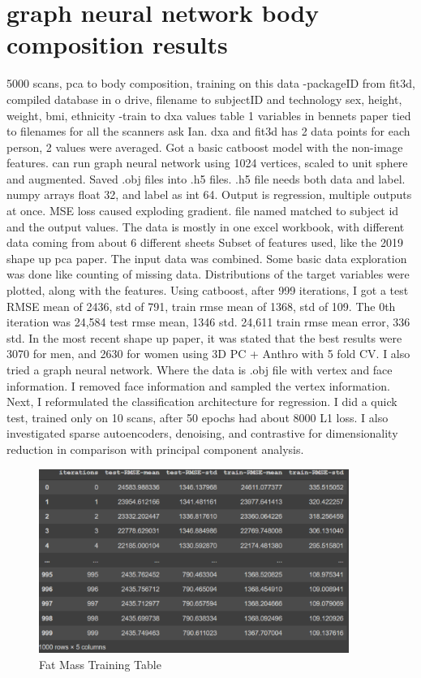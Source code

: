 \section{graph neural network body composition results}

5000 scans, pca to body composition, training on this data
-packageID from fit3d, compiled database in o drive, filename to subjectID and technology sex, height, weight, bmi, ethnicity
-train to dxa values
table 1 variables in bennets paper tied to filenames for all the scanners ask Ian. dxa and fit3d has 2 data points for each person, 2 values were averaged. Got a basic catboost model with the non-image features. can run graph neural network using 1024 vertices, scaled to unit sphere and augmented. Saved .obj files into .h5 files. .h5 file needs both data and label. numpy arrays float 32, and label as int 64. Output is regression, multiple outputs at once. MSE loss caused exploding gradient. file named matched to subject id and the output values. The data is mostly in one excel workbook, with different data coming from about 6 different sheets Subset of features used, like the 2019 shape up pca paper. The input data was combined. Some basic data exploration was done like counting of missing data. Distributions of the target variables were plotted, along with the features. Using catboost, after 999 iterations, I got a test RMSE mean of 2436, std of 791, train rmse mean of 1368, std of 109. The 0th iteration was 24,584 test rmse mean, 1346 std. 24,611 train rmse mean error, 336 std. In the most recent shape up paper, it was stated that the best results were 3070 for men, and 2630 for women using 3D PC + Anthro with 5 fold CV. I also tried a graph neural network. Where the data is .obj file with vertex and face information. I removed face information and sampled the vertex information. Next, I reformulated the classification architecture for regression. I did a quick test, trained only on 10 scans, after 50 epochs had about 8000 L1 loss. I also investigated sparse autoencoders, denoising, and contrastive for dimensionality reduction in comparison with principal component analysis.


\begin{figure}[h]
	\caption{Fat Mass Training Table}
	\centering
	\includegraphics[width=0.9\textwidth]{images/catboost_training.png}
\end{figure}

